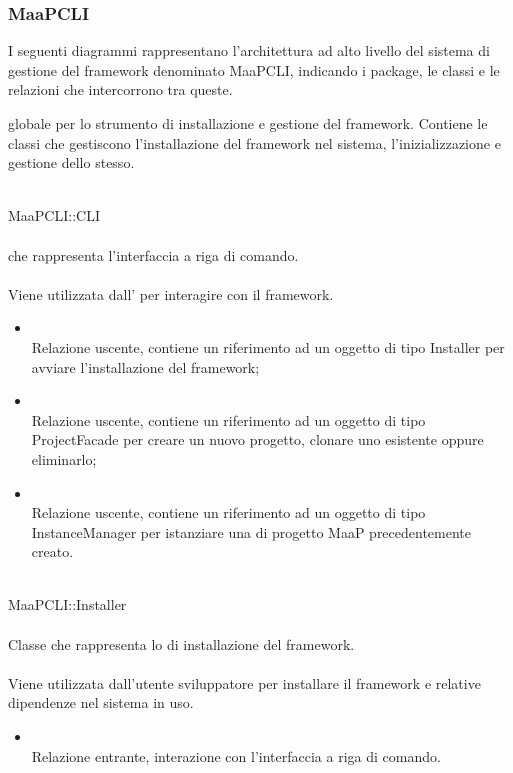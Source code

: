 \newpage
\subsubsection{MaaPCLI}
I seguenti diagrammi rappresentano l'architettura ad alto livello del sistema di gestione del framework denominato MaaPCLI, indicando i package, le classi e le relazioni che intercorrono tra queste.

 globale per lo strumento di installazione e gestione del framework. Contiene le classi che gestiscono l'installazione del framework nel sistema, l'inizializzazione e gestione dello stesso.


\\
MaaPCLI::CLI\\
\\
 che rappresenta l'interfaccia a riga di comando.\\
\\
Viene utilizzata dall' per interagire con il framework.\\
\begin{itemize}
\item{}\\
Relazione uscente, contiene un riferimento ad un oggetto di tipo Installer per avviare l'installazione del framework;
\item{}\\
Relazione uscente, contiene un riferimento ad un oggetto di tipo ProjectFacade per creare un nuovo progetto, clonare uno esistente oppure eliminarlo;
\item{}\\
Relazione uscente, contiene un riferimento ad un oggetto di tipo InstanceManager per istanziare una  di progetto MaaP precedentemente creato.
\end{itemize}

\\
MaaPCLI::Installer\\
\\
Classe che rappresenta lo  di installazione del framework.\\
\\
Viene utilizzata dall'utente sviluppatore per installare il framework e relative dipendenze nel sistema in uso.\\
\begin{itemize}
\item{}\\
Relazione entrante, interazione con l'interfaccia a riga di comando.
\end{itemize}

